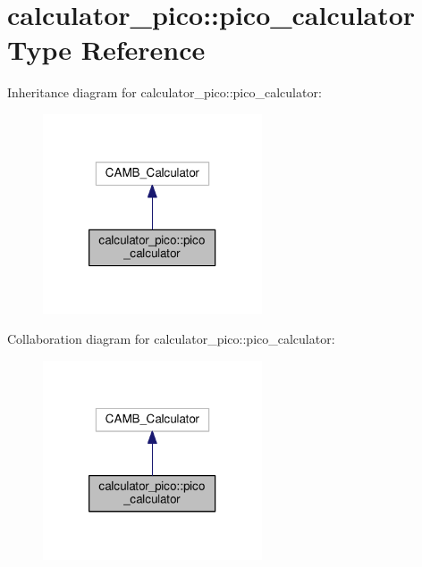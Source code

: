 \hypertarget{structcalculator__pico_1_1pico__calculator}{}\section{calculator\+\_\+pico\+:\+:pico\+\_\+calculator Type Reference}
\label{structcalculator__pico_1_1pico__calculator}


Inheritance diagram for calculator\+\_\+pico\+:\+:pico\+\_\+calculator\+:
\nopagebreak
\begin{figure}[H]
\begin{center}
\leavevmode
\includegraphics[width=184pt]{structcalculator__pico_1_1pico__calculator__inherit__graph}
\end{center}
\end{figure}


Collaboration diagram for calculator\+\_\+pico\+:\+:pico\+\_\+calculator\+:
\nopagebreak
\begin{figure}[H]
\begin{center}
\leavevmode
\includegraphics[width=184pt]{structcalculator__pico_1_1pico__calculator__coll__graph}
\end{center}
\end{figure}
